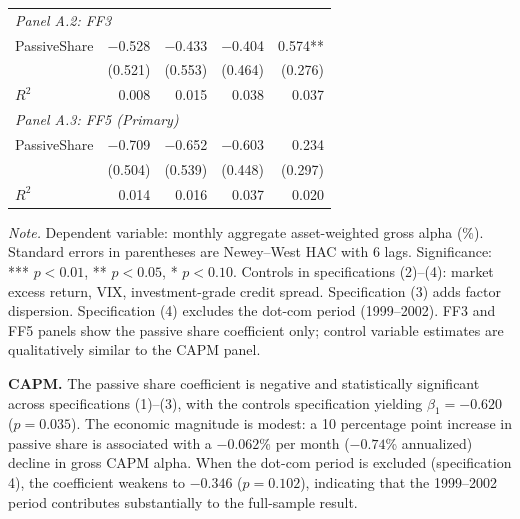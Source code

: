 \documentclass[11pt, a4paper]{article}
\begin{document}
\begin{table}[H]
\begin{tabular}{lrrrr}
\midrule
\multicolumn{5}{l}{\textit{Panel A.2: FF3}} \\
PassiveShare    & $-$0.528\phantom{***}  & $-$0.433\phantom{***}  & $-$0.404\phantom{***}  & 0.574**\phantom{*} \\
                & (0.521)               & (0.553)               & (0.464)               & (0.276) \\
$R^2$           & 0.008 & 0.015 & 0.038 & 0.037 \\
\midrule
\multicolumn{5}{l}{\textit{Panel A.3: FF5 (Primary)}} \\
PassiveShare    & $-$0.709\phantom{***}  & $-$0.652\phantom{***}  & $-$0.603\phantom{***}  & 0.234\phantom{***} \\
                & (0.504)               & (0.539)               & (0.448)               & (0.297) \\
$R^2$           & 0.014 & 0.016 & 0.037 & 0.020 \\
\bottomrule
\end{tabular}
\begin{flushleft}
\small\textit{Note.} Dependent variable: monthly aggregate asset-weighted gross alpha (\%). Standard errors in parentheses are Newey--West HAC with 6 lags. Significance: *** $p<0.01$, ** $p<0.05$, * $p<0.10$. Controls in specifications (2)--(4): market excess return, VIX, investment-grade credit spread. Specification (3) adds factor dispersion. Specification (4) excludes the dot-com period (1999--2002). FF3 and FF5 panels show the passive share coefficient only; control variable estimates are qualitatively similar to the CAPM panel.
\end{flushleft}
\end{table}

\textbf{CAPM.} The passive share coefficient is negative and statistically significant across specifications (1)--(3), with the controls specification yielding $\beta_1 = -0.620$ ($p = 0.035$). The economic magnitude is modest: a 10 percentage point increase in passive share is associated with a $-0.062$\% per month ($-0.74$\% annualized) decline in gross CAPM alpha. When the dot-com period is excluded (specification 4), the coefficient weakens to $-0.346$ ($p = 0.102$), indicating that the 1999--2002 period contributes substantially to the full-sample result.
\end{document}
